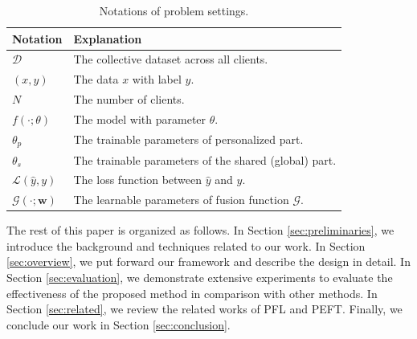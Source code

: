 \documentclass[sigconf]{acmart}
\begin{document}
\begin{table}[!tb]
\centering
\caption{Notations of problem settings.}
\label{tab:notation}
\begin{tabular}{ll} 
\toprule
\textbf{Notation} & \textbf{Explanation}  \\ 
\midrule
  $\mathcal{D}$       &    The collective dataset across all clients.     \\
  $(x, y)$            &    The data $x$ with label $y$.                   \\
  $N$                 &    The number of clients.                         \\
  $f(\cdot; \theta)$  &    The model with parameter $\theta$.              \\
  $\theta_{p}$        &    The trainable parameters of personalized part.    \\
  $\theta_{s}$        &    The trainable parameters of the shared (global) part.  \\
  $\mathcal{L}(\hat{y}, y)$        &    The loss function between $\hat{y}$ and $y$.  \\
  $\mathcal{G} (\cdot; \mathbf{w})$   &    The learnable parameters of fusion function $\mathcal{G}$.  \\
  
\bottomrule
\end{tabular}
\end{table}

\par
The rest of this paper is organized as follows. In Section \ref{sec:preliminaries}, we introduce the background and techniques related to our work. In Section \ref{sec:overview}, we put forward our framework and describe the design in detail. In Section \ref{sec:evaluation}, we demonstrate extensive experiments to evaluate the effectiveness of the proposed method in comparison with other methods. In Section \ref{sec:related}, we review  the related works of PFL and PEFT. Finally, we conclude our work in Section \ref{sec:conclusion}.
\end{document}
